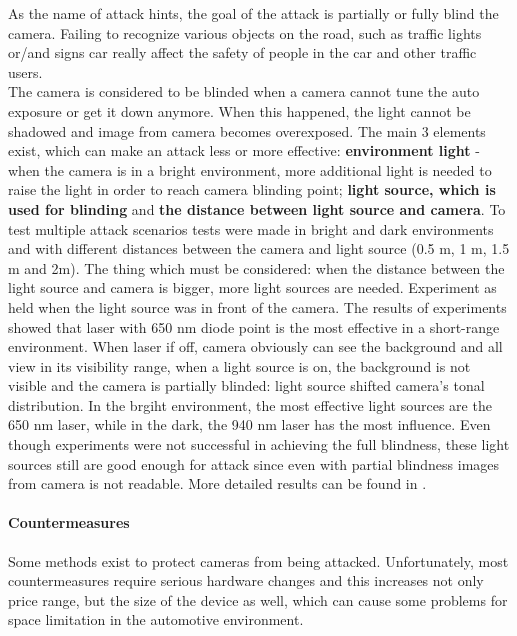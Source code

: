 As the name of attack hints, the goal of the attack is partially or fully blind the camera. Failing to recognize various objects on the road, such as traffic lights or/and signs car really affect the safety of people in the car and other traffic users. \\
The camera is considered to be blinded when a camera cannot tune the auto exposure or get it down anymore. When this happened, the light cannot be shadowed and image from camera becomes overexposed. The main 3 elements exist, which can make an attack less or more effective: \textbf{environment light} - when the camera is in a bright environment, more additional light is needed to raise the light in order to reach camera blinding point;  \textbf{light source, which is used for blinding} and \textbf{the distance between light source and camera}. To test multiple attack scenarios tests were made in bright and dark environments and with different distances between the camera and light source (0.5 m, 1 m, 1.5 m and 2m). The thing which must be considered: when the distance between the light source and camera is bigger, more light sources are needed. Experiment as held when the light source was in front of the camera. The results of experiments showed that laser with 650 nm diode point is the most effective in a short-range environment. When laser if off, camera obviously can see the background and all view in its visibility range, when a light source is on, the background is not visible and the camera is partially blinded: light source shifted camera's tonal distribution. In the brgiht environment, the most effective light sources are the 650 nm laser, while in the dark, the 940 nm laser has the most influence. Even though experiments were not successful in achieving the full blindness, these light sources still are good enough for attack since even with partial blindness images from camera is not readable. More detailed results can be found in \cite{AttacksOnSensors}.

\paragraph{Countermeasures}

Some methods exist to protect cameras from being attacked. Unfortunately, most countermeasures require serious hardware changes and this increases not only price range, but the size of the device as well, which can cause some problems for space limitation in the automotive environment.

